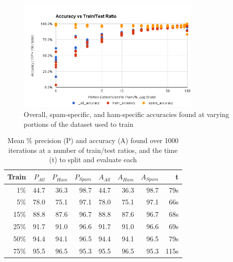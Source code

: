 \begin{figure}[ht!]
    \centering
    \includegraphics[width=90mm]{img/sms_basic-accuracy.png}
    \caption{Overall, spam-specific, and ham-specific accuracies found at varying portions of the dataset used to train}
    \label{fig:smsBasicAccuracy}
\end{figure}

\begin{table}
    \begin{tabular}{rrrrrrrr}
        \hline
        \textbf{Train} &
        \textbf{\begin{math}P_{All}\end{math}} & \textbf{\begin{math}P_{Ham}\end{math}} & \textbf{\begin{math}P_{Spam}\end{math}} &
        \textbf{\begin{math}A_{All}\end{math}} & \textbf{\begin{math}A_{Ham}\end{math}} & \textbf{\begin{math}A_{Spam}\end{math}} &
        \textbf{t} \\ [0.5ex]
        \hline\hline
        1\%  & 44.7 & 36.3 & 98.7 & 44.7 & 36.3 & 98.7 & 79s \\
        5\%  & 78.0 & 75.1 & 97.1 & 78.0 & 75.1 & 97.1 & 66s \\
        15\% & 88.8 & 87.6 & 96.7 & 88.8 & 87.6 & 96.7 & 68s \\
        25\% & 91.7 & 91.0 & 96.6 & 91.7 & 91.0 & 96.6 & 69s \\
        50\% & 94.4 & 94.1 & 96.5 & 94.4 & 94.1 & 96.5 & 79s \\
        75\% & 95.5 & 96.5 & 95.3 & 95.5 & 96.5 & 95.3 & 115s \\
        \hline
    \end{tabular}
    \caption{Mean \% precision (P) and accuracy (A) found over 1000 iterations at a number of train/test ratios,
    and the time (t) to split and evaluate each}
    \label{table:smsBasicResults}
\end{table}

